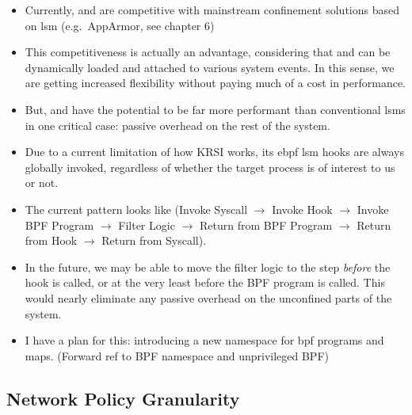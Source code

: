 \begin{inprogress}
  \begin{itemize}
    \item Currently, \bpfbox{} and \bpfcontain{} are competitive with mainstream
    confinement solutions based on \gls{lsm} (e.g.~AppArmor, see chapter 6)
    \item This competitiveness is actually an advantage, considering that \bpfbox{} and
    \bpfcontain{} can be dynamically loaded and attached to various system events. In this sense,
    we are getting increased flexibility without paying much of a cost in performance.
    \item But, \bpfbox{} and \bpfcontain{} have the potential to be far more performant than
    conventional \gls{lsm}s in one critical case: passive overhead on the rest of the system.
    \item Due to a current limitation of how KRSI works, its \gls{ebpf} \gls{lsm} hooks are
    always globally invoked, regardless of whether the target process is of interest to us or not.
    \item The current pattern looks like (Invoke Syscall $\rightarrow$ Invoke Hook
    $\rightarrow$ Invoke BPF Program $\rightarrow$ Filter Logic $\rightarrow$ Return from
    BPF Program $\rightarrow$ Return from Hook $\rightarrow$ Return from Syscall).
    \item In the future, we may be able to move the filter logic to the step
    \textit{before}  the hook is called, or at the very least before the BPF program is
    called. This would nearly eliminate any passive overhead on the unconfined parts of the system.
    \item I have a plan for this: introducing a new namespace for \gls{bpf} programs and
    maps. (Forward ref to BPF namespace and unprivileged BPF)
  \end{itemize}
\end{inprogress}

\subsection{Network Policy Granularity}

